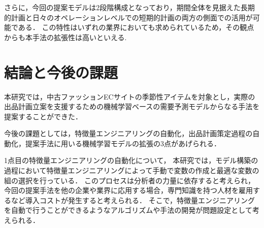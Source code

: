 \documentclass[dvipdfmx]{jreport}
\begin{document}
さらに，今回の提案モデルは2段階構成となっており，期間全体を見据えた長期的計画と日々のオペレーションレベルでの短期的計画の両方の側面での活用が可能である．
この特性はいずれの業界においても求められているため，その観点からも本手法の拡張性は高いといえる.



\section{結論と今後の課題}
本研究では，中古ファッションECサイトの季節性アイテムを対象とし，実際の出品計画立案を支援するための機械学習ベースの需要予測モデルからなる手法を提案することができた．

今後の課題としては，特徴量エンジニアリングの自動化，出品計画策定過程の自動化，提案手法に用いる機械学習モデルの拡張の3点があげられる．

1点目の特徴量エンジニアリングの自動化について，
本研究では，モデル構築の過程において特徴量エンジニアリングによって手動で変数の作成と最適な変数の組の選択を行っている．
このプロセスは分析者の力量に依存すると考えられ，今回の提案手法を他の企業や業界に応用する場合，専門知識を持つ人材を雇用するなど導入コストが発生すると考えられる．
そこで，特徴量エンジニアリングを自動で行うことができるようなアルゴリズムや手法の開発が問題設定として考えられる．
\end{document}
